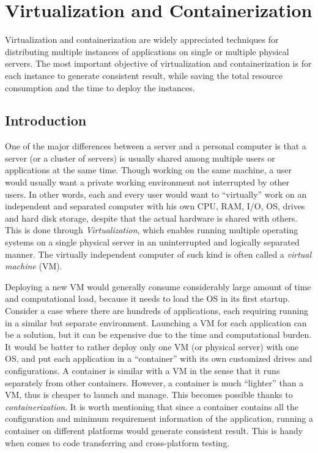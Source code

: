 \chapter{Virtualization and Containerization}

Virtualization and containerization are widely appreciated techniques for distributing multiple instances of applications on single or multiple physical servers. The most important objective of virtualization and containerization is for each instance to generate consistent result, while saving the total resource consumption and the time to deploy the instances.

\section{Introduction}

One of the major differences between a server and a personal computer is that a server (or a cluster of servers) is usually shared among multiple users or applications at the same time. Though working on the same machine, a user would usually want a private working environment not interrupted by other users. In other words, each and every user would want to ``virtually'' work on an independent and separated computer with his own CPU, RAM, I/O, OS, drives and hard disk storage, despite that the actual hardware is shared with others. This is done through \textit{Virtualization}, which enables running multiple operating systems on a single physical server in an uninterrupted and logically separated manner. The virtually independent computer of such kind is often called a \textit{virtual machine} (VM).

Deploying a new VM would generally consume considerably large amount of time and computational load, because it needs to load the OS in its first startup. Consider a case where there are hundreds of applications, each requiring running in a similar but separate environment. Launching a VM for each application can be a solution, but it can be expensive due to the time and computational burden. It would be batter to rather deploy only one VM (or physical server) with one OS, and put each application in a ``container'' with its own customized drives and configurations. A container is similar with a VM in the sense that it runs separately from other containers. However, a container is much ``lighter'' than a VM, thus is cheaper to launch and manage. This becomes possible thanks to \textit{containerization}. It is worth mentioning that since a container contains all the configuration and minimum requirement information of the application, running a container on different platforms would generate consistent result. This is handy when comes to code transferring and cross-platform testing.

